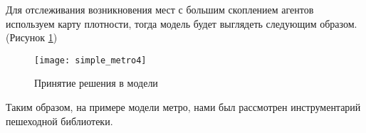 Для отслеживания возникновения мест с большим скоплением агентов используем карту плотности, тогда модель будет выглядеть следующим образом. (Рисунок \ref{fig:simple_metro4})
\begin{figure}[h]
	\centering \texttt{[image: simple\_metro4]}
	\caption{Принятие решения в модели}
	\label{fig:simple_metro4}
\end{figure}

Таким образом, на примере модели метро, нами был рассмотрен инструментарий пешеходной библиотеки.\\